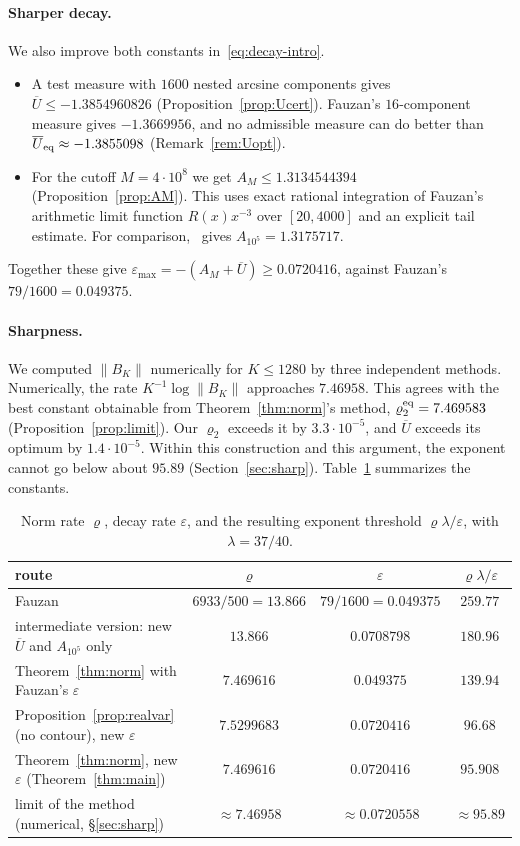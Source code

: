 \documentclass[11pt]{article}
\theoremstyle{remark}
\newcommand{\Ubar}{\overline{U}}
\newcommand{\epsmax}{\varepsilon_{\max}}
\begin{document}
\paragraph{Sharper decay.} We also improve both constants in~\eqref{eq:decay-intro}.
\begin{itemize}
\item A test measure with $1600$ nested arcsine components gives $\Ubar\le-1.3854960826$ (Proposition~\ref{prop:Ucert}). Fauzan's $16$-component measure gives $-1.3669956$, and no admissible measure can do better than $\Ubar_{\rm eq}\approx-1.3855098$ (Remark~\ref{rem:Uopt}).
\item For the cutoff $M=4\cdot10^8$ we get $A_M\le1.3134544394$ (Proposition~\ref{prop:AM}). This uses exact rational integration of Fauzan's arithmetic limit function $R(x)x^{-3}$ over $[20,4000]$ and an explicit tail estimate. For comparison,~\cite[(5.20)]{F} gives $A_{10^5}=1.3175717$.
\end{itemize}
Together these give $\epsmax=-(A_M+\Ubar)\ge0.0720416$, against Fauzan's $79/1600=0.049375$.

\paragraph{Sharpness.} We computed $\|B_K\|$ numerically for $K\le1280$ by three independent methods. Numerically, the rate $K^{-1}\log\|B_K\|$ approaches $7.46958$. This agrees with the best constant obtainable from Theorem~\ref{thm:norm}'s method, $\varrho_2^{\rm eq}=7.469583$ (Proposition~\ref{prop:limit}). Our $\varrho_2$ exceeds it by $3.3\cdot10^{-5}$, and $\Ubar$ exceeds its optimum by $1.4\cdot10^{-5}$. Within this construction and this argument, the exponent cannot go below about $95.89$ (Section~\ref{sec:sharp}). Table~\ref{tab:summary} summarizes the constants.

\begin{table}[ht]
\centering
\small
\begin{tabular}{lccc}
\toprule
route & $\varrho$ & $\varepsilon$ & $\varrho\lambda/\varepsilon$\\
\midrule
Fauzan~\cite{F} & $6933/500=13.866$ & $79/1600=0.049375$ & $259.77$\\
intermediate version: new $\Ubar$ and $A_{10^5}$ only & $13.866$ & $0.0708798$ & $180.96$\\
Theorem~\ref{thm:norm} with Fauzan's $\varepsilon$ & $7.469616$ & $0.049375$ & $139.94$\\
Proposition~\ref{prop:realvar} (no contour), new $\varepsilon$ & $7.5299683$ & $0.0720416$ & $96.68$\\
Theorem~\ref{thm:norm}, new $\varepsilon$ (Theorem~\ref{thm:main}) & $7.469616$ & $0.0720416$ & $95.908$\\
limit of the method (numerical, \S\ref{sec:sharp}) & $\approx7.46958$ & $\approx0.0720558$ & $\approx95.89$\\
\bottomrule
\end{tabular}
\caption{Norm rate $\varrho$, decay rate $\varepsilon$, and the resulting exponent threshold $\varrho\lambda/\varepsilon$, with $\lambda=37/40$.}
\label{tab:summary}
\end{table}
\end{document}
